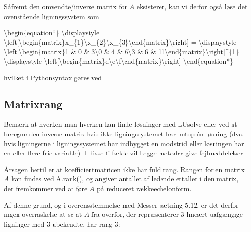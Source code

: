 \documentclass[letterpaper,10pt,english]{jupyterBook}
\begin{document}
\noindent{}

Såfremt den omvendte/inverse matrix for \(A\) eksisterer, kan vi derfor også løse det ovenstående ligningssystem som

\textbackslash{}begin\{equation*\}
\textbackslash{}displaystyle \textbackslash{}left{[}\textbackslash{}begin\{matrix\}x\_\{1\}\textbackslash{}x\_\{2\}\textbackslash{}x\_\{3\}\textbackslash{}end\{matrix\}\textbackslash{}right{]} =
\textbackslash{}displaystyle \textbackslash{}left{[}\textbackslash{}begin\{matrix\}1 \& 0 \& 3\textbackslash{}0 \& 4 \& 6\textbackslash{}3 \& 6 \& 11\textbackslash{}end\{matrix\}\textbackslash{}right{]}\textasciicircum{}\{\sphinxhyphen{}1\}
\textbackslash{}displaystyle \textbackslash{}left{[}\textbackslash{}begin\{matrix\}d\textbackslash{}e\textbackslash{}f\textbackslash{}end\{matrix\}\textbackslash{}right{]}
\textbackslash{}end\{equation*\}

hvilket i Python\sphinxhyphen{}syntax gøres ved

\begin{sphinxVerbatim}[commandchars=\\\{\}]
\end{sphinxVerbatim}

\noindent{}


\subsection{Matrixrang}
\label{\detokenize{notebooks/sympy/Notebook_LinAlg1:matrixrang}}
Bemærk at hverken man hverken kan finde løsninger med LUsolve eller ved at beregne den inverse matrix hvis  ikke ligningssystemet har netop én løsning (dvs. hvis ligningerne i ligningssystemet har indbygget en modstrid eller løsningen har en eller flere frie variable). I disse tilfælde vil begge metoder give fejlmeddelelser.

Årsagen hertil er at koefficientmatricen ikke har fuld rang. Rangen for en matrix \(A\) kan findes ved A.rank(), og angiver antallet af ledende et\sphinxhyphen{}taller i den matrix, der fremkommer ved at føre \(A\) på reduceret række\sphinxhyphen{}echelonform.

Af denne grund, og i overensstemmelse med Messer sætning 5.12, er det derfor ingen overraskelse at se at \(A\) fra overfor, der repræsenterer 3 lineært uafgængige ligninger med 3 ubekendte, har rang 3:
\end{document}
